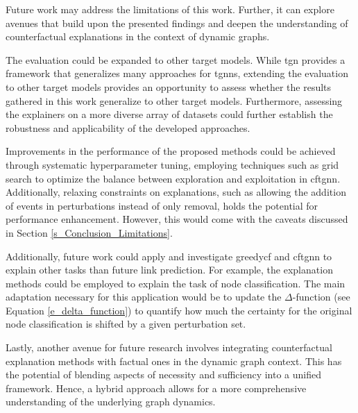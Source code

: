 Future work may address the limitations of this work. Further, it can explore avenues that build upon the presented findings and deepen the understanding of counterfactual explanations in the context of dynamic graphs. 

The evaluation could be expanded to other target models. While \gls{tgn} provides a framework that generalizes many approaches for \glspl{tgnn}, extending the evaluation to other target models provides an opportunity to assess whether the results gathered in this work generalize to other target models. Furthermore, assessing the explainers on a more diverse array of datasets could further establish the robustness and applicability of the developed approaches.

Improvements in the performance of the proposed methods could be achieved through systematic hyperparameter tuning, employing techniques such as grid search to optimize the balance between exploration and exploitation in \gls{cftgnn}. 
Additionally, relaxing constraints on explanations, such as allowing the addition of events in perturbations instead of only removal, holds the potential for performance enhancement. However, this would come with the caveats discussed in Section \ref{s_Conclusion_Limitations}.

Additionally, future work could apply and investigate \gls{greedycf} and \gls{cftgnn} to explain other tasks than future link prediction. For example, the explanation methods could be employed to explain the task of node classification. The main adaptation necessary for this application would be to update the $\Delta$-function (see Equation \ref{e_delta_function}) to quantify how much the certainty for the original node classification is shifted by a given perturbation set.


Lastly, another avenue for future research involves integrating counterfactual explanation methods with factual ones in the dynamic graph context. This has the potential of blending aspects of necessity and sufficiency into a unified framework. Hence, a hybrid approach allows for a more comprehensive understanding of the underlying graph dynamics.




